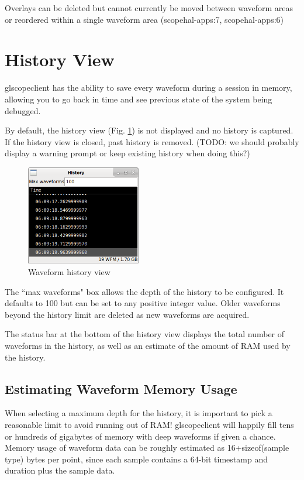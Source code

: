 \documentclass[11pt]{article}
\begin{document}
Overlays can be deleted but cannot currently be moved between waveform areas or reordered within a single waveform area
(scopehal-apps:7, scopehal-apps:6)

\pagebreak
\section{History View}
\label{sec:history}

glscopeclient has the ability to save every waveform during a session in memory, allowing you to go back in time and
see previous state of the system being debugged.

By default, the history view (Fig. \ref{historyview}) is not displayed and no history is captured. If the history view
is closed, past history is removed. (TODO: we should probably display a warning prompt or keep existing history when
doing this?)

\begin{figure}[H]
\centering
\includegraphics[width=5cm]{images/history-view.png}
\caption{Waveform history view}
\label{historyview}
\end{figure}

The ``max waveforms" box allows the depth of the history to be configured. It defaults to 100 but can be set to any
positive integer value. Older waveforms beyond the history limit are deleted as new waveforms are acquired.

The status bar at the bottom of the history view displays the total number of waveforms in the history, as well as an
estimate of the amount of RAM used by the history.

\subsection{Estimating Waveform Memory Usage}

When selecting a maximum depth for the history, it is important to pick a reasonable limit to avoid running out of RAM!
glscopeclient will happily fill tens or hundreds of gigabytes of memory with deep waveforms if given a chance. Memory
usage of waveform data can be roughly estimated as 16+sizeof(sample type) bytes per point, since each sample contains a
64-bit timestamp and duration plus the sample data.
\end{document}
